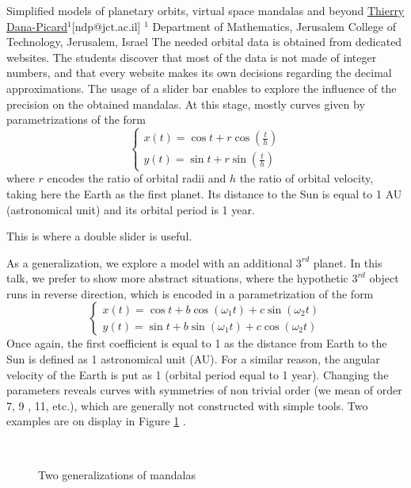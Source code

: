 \begin{abstract_online}{Simplified models of planetary orbits, virtual space mandalas and beyond}{%
        \underline{Thierry Dana-Picard}$^{1}$}{[ndp@jct.ac.il]
        }{%
        $^1$ Department of Mathematics, Jerusalem College of Technology, Jerusalem, Israel}
The needed orbital data is obtained from dedicated websites. The students discover that most of the data is not made of integer numbers, and that every website makes its own decisions regarding the  decimal approximations. The usage of a slider bar enables to explore the influence of the precision on the obtained mandalas. At this stage, mostly curves given by parametrizations of the form
\begin{equation*}
\begin{cases}
x(t)=\cos t + r  \cos(\frac th)\\
y(t)=\sin t + r  \sin (\frac th )
\end{cases}
\end{equation*}
where $r$ encodes the ratio of orbital radii and $h$ the ratio of orbital velocity, taking here the Earth as the first planet. Its distance to the Sun is equal to 1 AU (astronomical unit) and its orbital period is 1 year.

This is where a double slider is useful.

As a generalization, we explore a model with an additional  $3^{rd}$ planet. In this talk, we prefer to show more abstract situations, where the hypothetic $3^{rd}$ object runs in reverse direction, which is encoded in a parametrization of the form
 \begin{equation*}
\begin{cases}
x(t)=\cos t + b  \cos(\omega_1 t) + c \sin (\omega_2 t)\\
y(t)=\sin t + b  \sin (\omega_1 t ) + c \cos (\omega_2 t)
\end{cases}
\end{equation*}
Once again, the first coefficient is equal to 1 as the distance from Earth to the Sun is defined as 1 astronomical unit (AU).  For a similar reason, the angular velocity of the Earth is put as 1 (orbital period equal to 1 year).
Changing the parameters reveals curves with symmetries of non trivial order (we mean of order 7, 9 , 11, etc.), which are generally not constructed with simple tools. Two examples are on display in Figure \ref{fig generalizations} .
\begin{figure}[htb]
\centering
\mbox{
       \quad
       }
\caption{Two generalizations of mandalas}
\label{fig generalizations}
\end{figure}


\end{abstract_online}
